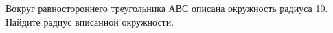  Вокруг равностороннего треугольника АВС описана окружность радиуса 10. Найдите радиус вписанной
окружности.

\begin{figure}[h]
\end{figure}
\Solution
